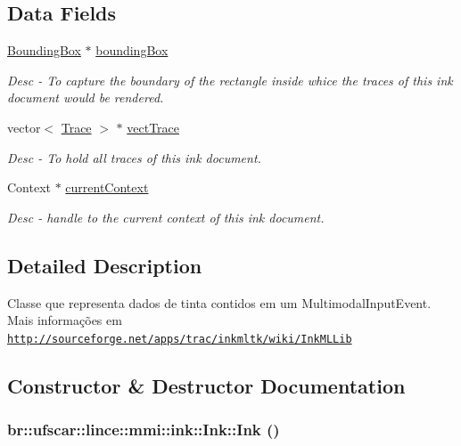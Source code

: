 \subsection*{Data Fields}
\begin{DoxyCompactItemize}
\item 
\hyperlink{structbr_1_1ufscar_1_1lince_1_1mmi_1_1ink_1_1structBoundingBox}{BoundingBox} $\ast$ \hyperlink{classbr_1_1ufscar_1_1lince_1_1mmi_1_1ink_1_1Ink_aba7f2aa5e6398319ff07182898bc21a8}{boundingBox}
\begin{DoxyCompactList}\small\item\em Desc -\/ To capture the boundary of the rectangle inside whice the traces of this ink document would be rendered. \item\end{DoxyCompactList}\item 
vector$<$ \hyperlink{classbr_1_1ufscar_1_1lince_1_1mmi_1_1ink_1_1Trace}{Trace} $>$ $\ast$ \hyperlink{classbr_1_1ufscar_1_1lince_1_1mmi_1_1ink_1_1Ink_a9dee6cfd152a6de770ac10b40e761ef8}{vectTrace}
\begin{DoxyCompactList}\small\item\em Desc -\/ To hold all traces of this ink document. \item\end{DoxyCompactList}\item 
Context $\ast$ \hyperlink{classbr_1_1ufscar_1_1lince_1_1mmi_1_1ink_1_1Ink_a13e685700da2ba95fa84c48b7aa339f9}{currentContext}
\begin{DoxyCompactList}\small\item\em Desc -\/ handle to the current context of this ink document. \item\end{DoxyCompactList}\end{DoxyCompactItemize}


\subsection{Detailed Description}
Classe que representa dados de tinta contidos em um MultimodalInputEvent. Mais informações em \href{http://sourceforge.net/apps/trac/inkmltk/wiki/InkMLLib}{\tt http://sourceforge.net/apps/trac/inkmltk/wiki/InkMLLib} 

\subsection{Constructor \& Destructor Documentation}
\hypertarget{classbr_1_1ufscar_1_1lince_1_1mmi_1_1ink_1_1Ink_ada758b5f8c862e96b3bc0ab8ab5c305e}{
\subsubsection[{Ink}]{\setlength{\rightskip}{0pt plus 5cm}br::ufscar::lince::mmi::ink::Ink::Ink ()}}
\label{classbr_1_1ufscar_1_1lince_1_1mmi_1_1ink_1_1Ink_ada758b5f8c862e96b3bc0ab8ab5c305e}


